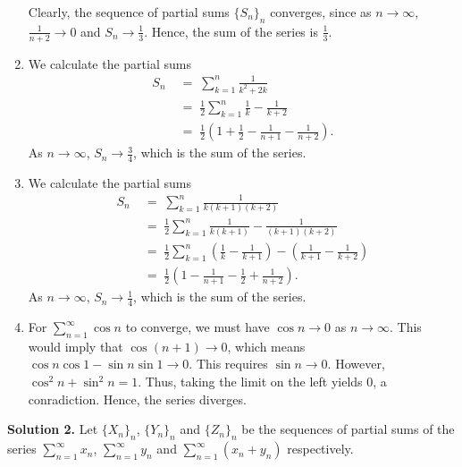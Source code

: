 \documentclass[10pt]{article}
\begin{document}
\begin{enumerate}
                        Clearly, the sequence of partial sums $\{S_n\}_n$ converges, since as $n \to \infty$, $\frac{1}{n + 2} \to 0$
                        and $S_n \to \frac{1}{3}$. Hence, the sum of the series is $\frac{1}{3}$.
                \item We calculate the partial sums
                        \begin{align*}
                                S_n \;&=\; \sum_{k = 1}^n \frac{1}{k^2 + 2k} \\
                                        \;&=\; \frac{1}{2}\sum_{k = 1}^n \frac{1}{k} - \frac{1}{k + 2} \\
                                        \;&=\; \frac{1}{2} \left( 1 + \frac{1}{2} - \frac{1}{n + 1} - \frac{1}{n + 2} \right).
                        \end{align*}
                        As $n \to \infty$, $S_n \to \frac{3}{4}$, which is the sum of the series.
                \item We calculate the partial sums
                        \begin{align*}
                                S_n \;&=\; \sum_{k = 1}^n \frac{1}{k(k + 1)(k + 2)} \\
                                        \;&=\; \frac{1}{2}\sum_{k = 1}^n \frac{1}{k(k + 1)} - \frac{1}{(k + 1)(k + 2)} \\
                                        \;&=\; \frac{1}{2}\sum_{k = 1}^n \left(\frac{1}{k} - \frac{1}{k + 1}\right) - \left(\frac{1}{k + 1} - \frac{1}{k + 2}\right) \\
                                        \;&=\; \frac{1}{2} \left( 1 - \frac{1}{n + 1} - \frac{1}{2} + \frac{1}{n + 2} \right).
                        \end{align*}
                        As $n \to \infty$, $S_n \to \frac{1}{4}$, which is the sum of the series.
                \item For $\sum_{n = 1}^\infty \cos{n}$ to converge, we must have $\cos{n} \to 0$ as $n \to \infty$. This would imply
                        that $\cos(n + 1) \to 0$, which means $\cos{n}\cos{1} - \sin{n}\sin{1} \to 0$. This requires $\sin{n} \to 0$.
                        However, $\cos^2{n} + \sin^2{n} = 1$. Thus, taking the limit on the left yields $0$, a conradiction.
                        Hence, the series diverges.
        \end{enumerate}

        \textbf{Solution 2.}
        Let $\{X_n\}_n$, $\{Y_n\}_n$ and $\{Z_n\}_n$ be the sequences of partial sums of the series $\sum_{n = 1}^\infty x_n$,
        $\sum_{n = 1}^\infty y_n$ and $\sum_{n = 1}^\infty (x_n + y_n)$ respectively.
\end{document}
